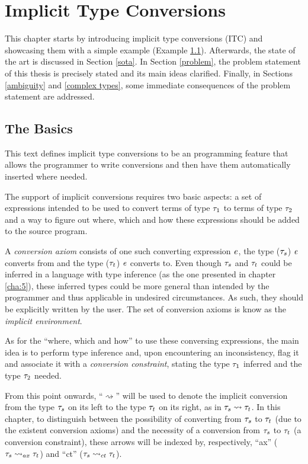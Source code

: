 \chapter{Implicit Type Conversions}
\label{cha:4}

This chapter starts by introducing implicit type conversions (ITC) and showcasing them with a simple example (Example \ref{itc4}). Afterwards, the state of the art is discussed in Section \ref{sota}. In Section \ref{problem}, the problem statement of this thesis is precisely stated and its main ideas clarified. Finally, in Sections \ref{ambiguity} and \ref{complex types}, some immediate consequences of the problem statement are addressed.

\section{The Basics}
\label{itc4}
This text defines implicit type conversions to be an programming feature that allows the programmer to write conversions and then have them automatically inserted where needed.

The support of implicit conversions requires two basic aspects: a set of expressions intended to be used to convert terms of type $\mathit{\tau}_1$ to terms of type $\mathit{\tau}_2$ and a way to figure out where, which and how these expressions should be added to the source program.

A \textit{conversion axiom} consists of one such converting expression $\mathit{e}$, the type ($\mathit{\tau}_s$) $\mathit{e}$ converts from and the type ($\mathit{\tau}_t$) $\mathit{e}$ converts to. Even though $\mathit{\tau}_s$ and $\mathit{\tau}_t$ could be inferred in a language with type inference (as the one presented in chapter \ref{cha:5}), these inferred types could be more general than intended by the programmer and thus applicable in undesired circumstances. As such, they should be explicitly written by the user. The set of conversion axioms is know as the \textit{implicit environment}.

As for the ``where, which and how'' to use these conversing expressions, the main idea is to perform type inference and, upon encountering an inconsistency, flag it and associate it with a \textit{conversion constraint}, stating the type $\mathit{\tau}_1$ inferred and the type $\mathit{\tau}_2$ needed.

From this point onwards, ``$\rightsquigarrow$'' will be used to denote the implicit conversion from the type $\mathit{\tau}_s$ on its left to the type $\mathit{\tau}_t$ on its right, as in  $\mathit{\tau}_s \rightsquigarrow \mathit{\tau}_t$. In this chapter, to distinguish between the possibility of converting from $\mathit{\tau}_s$ to $\mathit{\tau}_t$ (due to the existent conversion axioms) and the necessity of a conversion from $\mathit{\tau}_s$ to $\mathit{\tau}_t$ (a conversion constraint), these arrows will be indexed by, respectively, ``ax'' ($\mathit{\tau}_s\rightsquigarrow_{ax}\mathit{\tau}_t$) and ``ct'' ($\mathit{\tau}_s\rightsquigarrow_{ct}\mathit{\tau}_t$).

